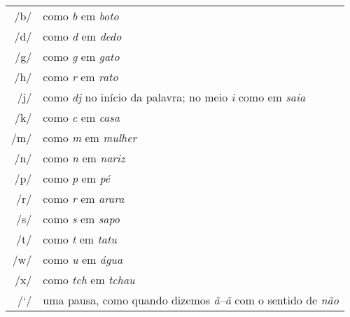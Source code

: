 \begingroup
\begin{tabular}{rl}
/b/ & como \textit{b} em \textit{boto}\\
/d/ & como \textit{d} em \textit{dedo}\\
/g/ & como \textit{g} em \textit{gato}\\
/h/ & como \textit{r} em \textit{rato}\\
/j/ & como \textit{dj} no início da palavra; no meio \textit{i} como em \textit{saia}\\
/k/ & como \textit{c} em \textit{casa}\\
/m/ & como \textit{m} em \textit{mulher}\\
/n/ & como \textit{n} em \textit{nariz}\\
/p/ & como \textit{p} em \textit{pé}\\
/r/ & como \textit{r} em \textit{arara}\\
/s/ & como \textit{s} em \textit{sapo}\\
/t/ & como \textit{t} em \textit{tatu}\\
/w/ & como \textit{u} em \textit{água}\\
/x/ & como \textit{tch} em \textit{tchau}\\
/`/ & uma pausa, como quando dizemos \textit{ã--ã} com o sentido de \textit{não}\protect\footnotemark
\end{tabular}\\


\endgroup

